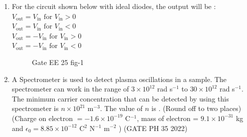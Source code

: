 \begin{enumerate}[label=\thechapter.\arabic*,ref=\thechapter.\theenumi]
\item For the circuit shown below with ideal diodes, the output will be :\\
 $V_{\text{out}} = V_{\text{in}} \text{ for } V_{\text{in}}>0 $ \\
 $V_{\text{out}} = V_{\text{in}} \text{ for } V_{\text{in}}<0 $ \\
 $V_{\text{out}} = -V_{\text{in}} \text{ for } V_{\text{in}}>0 $ \\
 $V_{\text{out}} = -V_{\text{in}} \text{ for } V_{\text{in}}<0 $ \\

\begin{figure}[ht]
  \centering
  \resizebox{0.55\columnwidth}{!}{}
  \caption{Gate EE 25 fig-1}
  \label{fig:gate_ee_25_1}
\end{figure}
\solution

\pagebreak

\item A Spectrometer is used to detect plasma oscillations in a sample. The spectrometer 
can work in the range of $3 \times 10^{12}$ rad s$^{-1}$ to $30 \times 10^{12}$ rad s$^{-1}$. The minimum carrier concentration that can be detected by using this spectrometer is $n \times 10^{21}$ m$^{-3}$. The value of $n$ is \underline{\hspace{2cm}}. (Round off to two places)
(Charge on electron $= -1.6 \times 10^{-19} $ C$^{-1}$, mass of electron = $9.1 \times 10^{-31}$ kg and $\epsilon_0 = 8.85 \times 10^{-12}$ C$^{2}$ N$^{-1}$ m$^{-2}$ ) \hfill(GATE PH 35 2022)\\
\solution

\pagebreak

\end{enumerate}
